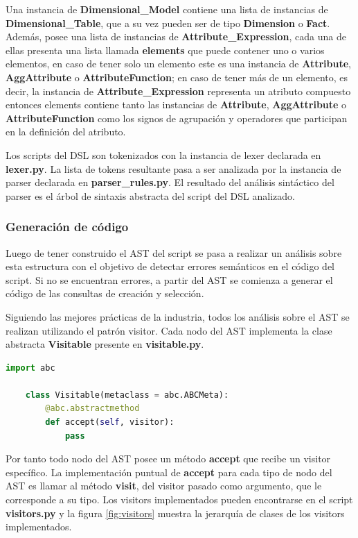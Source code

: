 Una instancia de \textbf{Dimensional\_Model} contiene una lista de instancias de \textbf{Dimensional\_Table}, que a su vez pueden ser de tipo 
\textbf{Dimension} o \textbf{Fact}. Además, posee una lista de instancias de \textbf{Attribute\_Expression}, cada 
una de ellas presenta 
una lista llamada \textbf{elements} que puede contener uno o varios elementos, en caso de tener solo un elemento 
este es una instancia de \textbf{Attribute}, \textbf{AggAttribute} o \textbf{AttributeFunction}; en caso de tener 
m\'as de un elemento, es decir, la instancia de \textbf{Attribute\_Expression} representa un atributo compuesto entonces 
elements contiene tanto las instancias de \textbf{Attribute}, \textbf{AggAttribute} o \textbf{AttributeFunction} como 
los signos de agrupación y operadores que participan en la definición del atributo.

Los scripts del DSL son tokenizados con la instancia de lexer declarada en \textbf{lexer.py}. La lista de tokens 
resultante pasa a ser analizada por la instancia de parser declarada en \textbf{parser\_rules.py}. El resultado 
del análisis sintáctico del parser es el \'arbol de sintaxis abstracta del script del DSL analizado.


\subsubsection{Generaci\'on de c\'odigo}

Luego de tener construido el AST del script se pasa a realizar un análisis sobre esta estructura con 
el objetivo de detectar errores semánticos en el código del script. Si no se encuentran errores, 
a partir del AST se comienza a generar el código de las consultas de creación y selección.

Siguiendo las mejores prácticas de la industria, todos los análisis sobre el AST se realizan 
utilizando el patrón visitor\cite{buttner2004digging}. Cada nodo del AST implementa la clase abstracta 
\textbf{Visitable} presente en \textbf{visitable.py}. 

\begin{lstlisting}[label={code:visitable}, caption={Clase abstracta Visitable}, language={python}]
    import abc

    class Visitable(metaclass = abc.ABCMeta):
        @abc.abstractmethod
        def accept(self, visitor):
            pass
\end{lstlisting}

Por tanto todo nodo del AST posee un método \textbf{accept} que recibe un visitor específico. La implementación 
puntual de \textbf{accept} para cada tipo de nodo del AST es llamar al método \textbf{visit}, del visitor pasado como argumento, 
que le corresponde a su tipo. Los visitors implementados pueden encontrarse en el script \textbf{visitors.py} y la 
figura \ref{fig:visitors} muestra la jerarquía de clases de los visitors implementados.


